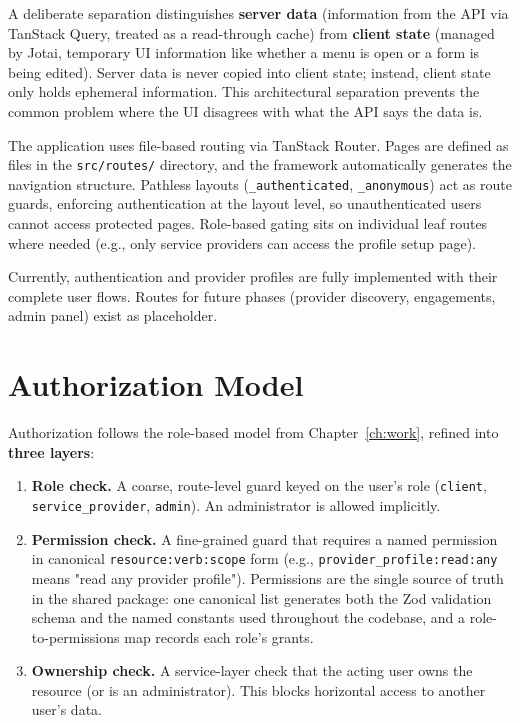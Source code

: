 A deliberate separation distinguishes \textbf{server data} (information from the
API via TanStack Query, treated as a read-through cache) from \textbf{client
state} (managed by Jotai, temporary UI information like whether a menu is open or
a form is being edited). Server data is never copied into client state; instead,
client state only holds ephemeral information. This architectural separation
prevents the common problem where the UI disagrees with what the API says the
data is.

The application uses file-based routing via TanStack Router. Pages are defined as
files in the \texttt{src/routes/} directory, and the framework automatically
generates the navigation structure. Pathless layouts (\texttt{\_authenticated},
\texttt{\_anonymous}) act as route guards, enforcing authentication at the layout
level, so unauthenticated users cannot access protected pages. Role-based gating
sits on individual leaf routes where needed (e.g., only service providers can
access the profile setup page).

Currently, authentication and provider profiles
are fully implemented with their complete user flows. Routes for future phases
(provider discovery, engagements, admin panel) exist as placeholder.

\section{Authorization Model}
\label{sec:rbac-impl}
Authorization follows the role-based model from Chapter~\ref{ch:work}, refined
into \textbf{three layers}:

\begin{enumerate}
	\item \textbf{Role check.} A coarse, route-level guard keyed on the user's
	      role (\texttt{client}, \texttt{service\_provider}, \texttt{admin}). An
	      administrator is allowed implicitly.
	\item \textbf{Permission check.} A fine-grained guard that requires a named
	      permission in canonical \texttt{resource:verb:scope} form (e.g.,
	      \texttt{provider\_profile:read:any} means "read any provider profile").
	      Permissions are the single source of truth in the shared package: one
	      canonical list generates both the Zod validation schema and the named
	      constants used throughout the codebase, and a role-to-permissions map
	      records each role's grants.
	\item \textbf{Ownership check.} A service-layer check that the acting user
	      owns the resource (or is an administrator). This blocks horizontal
	      access to another user's data.
\end{enumerate}

